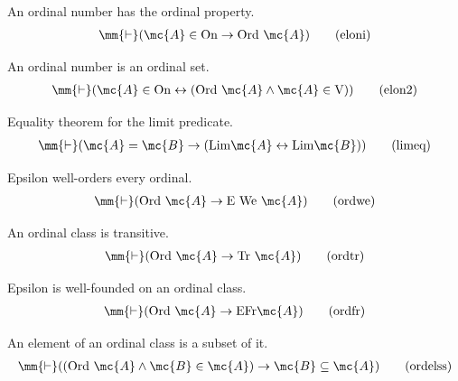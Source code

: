 \begin{lemma} An ordinal number has the ordinal property. 
\begin{align}
\mm{\vdash} ( \mc{A} \in {\rm On} \rightarrow {\rm Ord}~ \mc{A}
    )\label{eq:eloni}\tag{eloni}
\end{align}
\end{lemma}


\begin{lemma} An ordinal number is an ordinal set. 
\begin{align}
\mm{\vdash} ( \mc{A} \in {\rm On} \leftrightarrow ( {\rm Ord}~ \mc{A} \wedge
    \mc{A} \in {\rm V} ) )\label{eq:elon2}\tag{elon2}
\end{align}
\end{lemma}


\begin{lemma} Equality theorem for the limit predicate. 
\begin{align}
\mm{\vdash} ( \mc{A} = \mc{B} \rightarrow ( {\rm Lim} \mc{A} \leftrightarrow
    {\rm Lim} \mc{B} ) )\label{eq:limeq}\tag{limeq}
\end{align}
\end{lemma}


\begin{lemma} Epsilon well-orders every ordinal. 
\begin{align}
\mm{\vdash} ( {\rm Ord}~ \mc{A} \rightarrow {\rm E} ~{\rm We}~ \mc{A}
    )\label{eq:ordwe}\tag{ordwe}
\end{align}
\end{lemma}


\begin{lemma} An ordinal class is transitive.  
\begin{align}
\mm{\vdash} ( {\rm Ord}~ \mc{A} \rightarrow {\rm Tr}~ \mc{A}
    )\label{eq:ordtr}\tag{ordtr}
\end{align}
\end{lemma}


\begin{lemma} Epsilon is well-founded on an ordinal class. 
\begin{align}
\mm{\vdash} ( {\rm Ord}~ \mc{A} \rightarrow {\rm E} {\rm Fr} \mc{A}
    )\label{eq:ordfr}\tag{ordfr}
\end{align}
\end{lemma}


\begin{lemma} An element of an ordinal class is a subset
of it.  
\begin{align}
\mm{\vdash} ( ( {\rm Ord}~ \mc{A} \wedge \mc{B} \in \mc{A} ) \rightarrow \mc{B}
    \subseteq \mc{A} )\label{eq:ordelss}\tag{ordelss}
\end{align}
\end{lemma}


